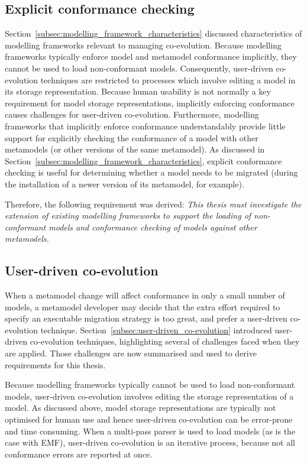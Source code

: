 \subsection{Explicit conformance checking}
Section~\ref{subsec:modelling_framework_characteristics} discussed characteristics of modelling frameworks relevant to managing co-evolution. Because modelling frameworks typically enforce model and metamodel conformance implicitly, they cannot be used to load non-conformant models. Consequently, user-driven co-evolution techniques are restricted to processes which involve editing a model in its storage representation. Because human usability is not normally a key requirement for model storage representations, implicitly enforcing conformance causes challenges for user-driven co-evolution. Furthermore, modelling frameworks that implicitly enforce conformance understandably provide little support for explicitly checking the conformance of a model with other metamodels (or other versions of the same metamodel). As discussed in Section~\ref{subsec:modelling_framework_characteristics}, explicit conformance checking is useful for determining whether a model needs to be migrated (during the installation of a newer version of its metamodel, for example).

Therefore, the following requirement was derived: \emph{This thesis must investigate the extension of existing modelling frameworks to support the loading of non-conformant models and conformance checking of models against other metamodels.}




\subsection{User-driven co-evolution}
When a metamodel change will affect conformance in only a small number of models, a metamodel developer may decide that the extra effort required to specify an executable migration strategy is too great, and prefer a user-driven co-evolution technique. Section~\ref{subsec:user-driven_co-evolution} introduced user-driven co-evolution techniques, highlighting several of challenges faced when they are applied. Those challenges are now summarised and used to derive requirements for this thesis.

Because modelling frameworks typically cannot be used to load non-conformant models, user-driven co-evolution involves editing the storage representation of a model. As discussed above, model storage representations are typically not optimised for human use and hence user-driven co-evolution can be error-prone and time consuming. When a multi-pass parser is used to load models (as is the case with EMF), user-driven co-evolution is an iterative process, because not all conformance errors are reported at once.


